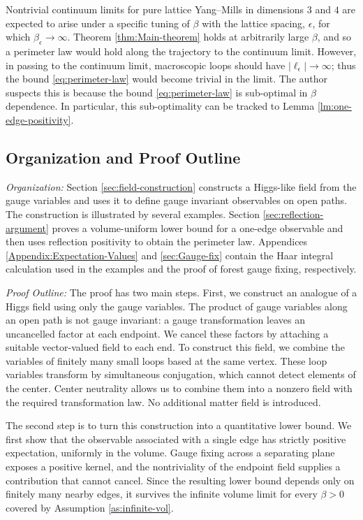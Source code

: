 \documentclass[reqno]{amsart}
\begin{document}
\begin{remark}
    Nontrivial continuum limits for pure lattice Yang--Mills in dimensions $3$ and $4$ are expected to arise under a specific tuning of $\beta$ with the lattice spacing, $\epsilon$, for which $\beta_{\epsilon} \to \infty$. Theorem \ref{thm:Main-theorem} holds at arbitrarily large $\beta$, and so a perimeter law would hold along the trajectory to the continuum limit. However, in passing to the continuum limit, macroscopic loops should have $|\ell_{\epsilon}| \to \infty$; thus the bound \eqref{eq:perimeter-law} would become trivial in the limit. The author suspects this is because the bound \eqref{eq:perimeter-law} is sub-optimal in $\beta$ dependence. In particular, this sub-optimality can be tracked to Lemma \ref{lm:one-edge-positivity}.
\end{remark}

\subsection{Organization and Proof Outline}

\textit{Organization:} Section \ref{sec:field-construction} constructs a
Higgs-like field from the gauge variables and uses it to define gauge
invariant observables on open paths. The construction is illustrated by
several examples. Section \ref{sec:reflection-argument} proves a
volume-uniform lower bound for a one-edge observable and then uses
reflection positivity to obtain the perimeter law. Appendices
\ref{Appendix:Expectation-Values} and \ref{sec:Gauge-fix} contain the
Haar integral calculation used in the examples and the proof of forest
gauge fixing, respectively.

\textit{Proof Outline:} The proof has two main steps. First, we construct
an analogue of a Higgs field using only the gauge variables. The product
of gauge variables along an open path is not gauge invariant: a gauge
transformation leaves an uncancelled factor at each endpoint. We cancel
these factors by attaching a suitable vector-valued field to each end.
To construct this field, we combine the variables of finitely many small
loops based at the same vertex. These loop variables transform by
simultaneous conjugation, which cannot detect elements of the center.
Center neutrality allows us to combine them into a
nonzero field with the required transformation law. No additional matter
field is introduced.

The second step is to turn this construction into a quantitative lower
bound. We first show that the observable associated with a single edge
has strictly positive expectation, uniformly in the volume. Gauge
fixing across a separating plane exposes a positive kernel, and the
nontriviality of the endpoint field supplies a contribution that cannot
cancel. Since the resulting lower bound depends only on finitely many
nearby edges, it survives the infinite volume limit for every
$\beta>0$ covered by Assumption \ref{as:infinite-vol}.
\end{document}
